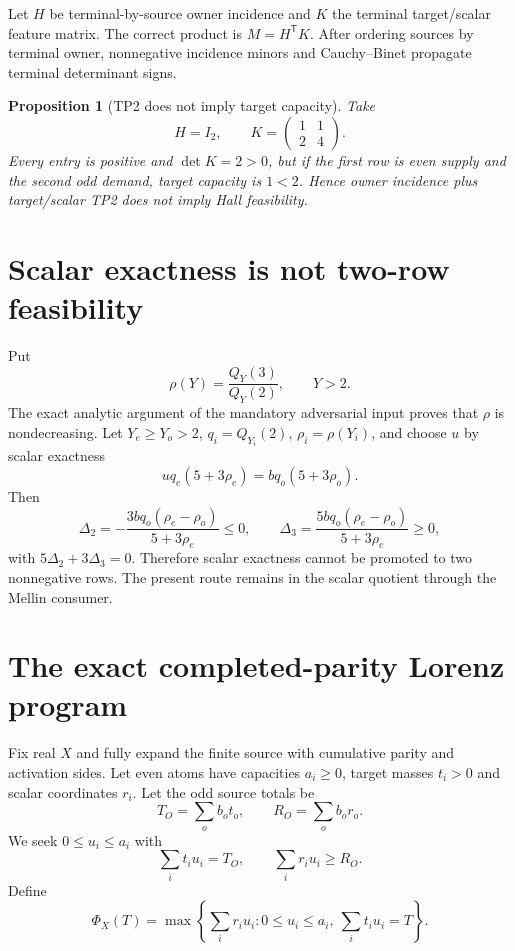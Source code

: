 \documentclass[11pt]{article}
\newtheorem{proposition}[theorem]{Proposition}
\newcommand{\1}{\mathbf 1}
\newcommand{\PhiX}{\Phi_X}
\begin{document}
Let $H$ be terminal-by-source owner incidence and $K$ the terminal target/scalar feature matrix. The correct product is $M=H^{\mathsf T}K$. After ordering sources by terminal owner, nonnegative incidence minors and Cauchy--Binet propagate terminal determinant signs.

\begin{proposition}[TP2 does not imply target capacity]\label{prop:tp2}
Take
\[
 H=I_2,\qquad K=\begin{pmatrix}1&1\\2&4\end{pmatrix}.
\]
Every entry is positive and $\det K=2>0$, but if the first row is even supply and the second odd demand, target capacity is $1<2$. Hence owner incidence plus target/scalar TP2 does not imply Hall feasibility.
\end{proposition}

\section{Scalar exactness is not two-row feasibility}

Put
\[
 \rho(Y)=\frac{Q_Y(3)}{Q_Y(2)},\qquad Y>2.
\]
The exact analytic argument of the mandatory adversarial input proves that $\rho$ is nondecreasing. Let $Y_e\ge Y_o>2$, $q_i=Q_{Y_i}(2)$, $\rho_i=\rho(Y_i)$, and choose $u$ by scalar exactness
\[
 u q_e(5+3\rho_e)=bq_o(5+3\rho_o).
\]
Then
\[
 \Delta_2=-\frac{3bq_o(\rho_e-\rho_o)}{5+3\rho_e}\le0,
 \qquad
 \Delta_3=\frac{5bq_o(\rho_e-\rho_o)}{5+3\rho_e}\ge0,
\]
with $5\Delta_2+3\Delta_3=0$. Therefore scalar exactness cannot be promoted to two nonnegative rows. The present route remains in the scalar quotient through the Mellin consumer.

\section{The exact completed-parity Lorenz program}

Fix real $X$ and fully expand the finite source with cumulative parity and activation sides. Let even atoms have capacities $a_i\ge0$, target masses $t_i>0$ and scalar coordinates $r_i$. Let the odd source totals be
\[
 T_O=\sum_ob_ot_o,\qquad R_O=\sum_ob_or_o.
\]
We seek $0\le u_i\le a_i$ with
\[
 \sum_i t_i u_i=T_O,\qquad\sum_i r_i u_i\ge R_O.
\]
Define
\[
 \PhiX(T)=\max\left\{\sum_i r_i u_i:0\le u_i\le a_i,\ \sum_i t_i u_i=T\right\}.
\]
\end{document}
